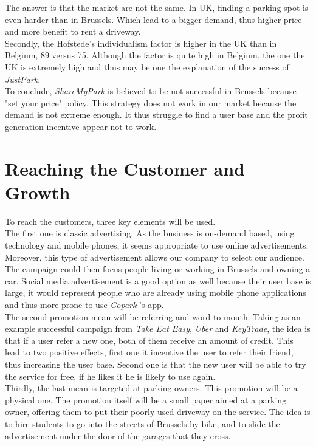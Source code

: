 \documentclass[12pt,a4paper,oneside]{book}
\newcommand{\bp}{\textit{Copark }}
\begin{document}
The answer is that the market are not the same. In UK, finding a parking spot is even harder than in Brussels.\citep{londonpark} Which lead to a bigger demand, thus higher price and more benefit to rent a driveway.\\
Secondly, the Hofstede's individualism factor is higher in the UK than in Belgium, 89 versus 75.\cite{hukbe} Although the factor is quite high in Belgium, the one the UK is extremely high and thus may be one the explanation of the success of \textit{JustPark}.\\

To conclude, \textit{ShareMyPark} is believed to be not successful in Brussels because "set your price" policy. This strategy does not work in our market because the demand is not extreme enough. It thus struggle to find a user base and the profit generation incentive appear not to work.

\section{Reaching the Customer and Growth}
To reach the customers, three key elements will be used.\\

The first one is classic advertising. As the business is on-demand based, using technology and mobile phones, it seems appropriate to use online advertisements. Moreover, this type of advertisement allows our company to select our audience. The campaign could then focus people living or working in Brussels and owning a car. Social media advertisement is a good option as well because their user base is large, it would represent people who are already using mobile phone applications and thus more prone to use \bp's app.\\

The second promotion mean will be referring and word-to-mouth. Taking as an example successful campaign from \textit{Take Eat Easy}, \textit{Uber} and \textit{KeyTrade}, the idea is that if a user refer a new one, both of them receive an amount of credit. This lead to two positive effects, first one it incentive the user to refer their friend, thus increasing the user base. Second one is that the new user will be able to try the service for free, if he likes it he is likely to use again.\\

Thirdly, the last mean is targeted at parking owners. This promotion will be a physical one. The promotion itself will be a small paper aimed at a parking owner, offering them to put their poorly used driveway on the service. The idea is to hire students to go into the streets of Brussels by bike, and to slide the advertisement under the door of the garages that they cross.\\
\end{document}
